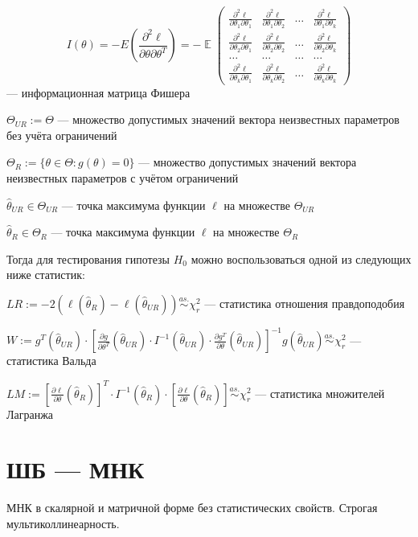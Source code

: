 \documentclass[12pt]{article}
\DeclareMathOperator{\E}{\mathbb{E}}
\begin{document}
\[
I(\theta) = -E \left(\frac{\partial^2 \ell}{\partial \theta \partial \theta^T}\right) = - \E \begin{pmatrix}
\frac{\partial^2 \ell}{\partial \theta_1 \partial \theta_1} & \frac{\partial^2 \ell}{\partial \theta_1 \partial \theta_2} & \ldots & \frac{\partial^2 \ell}{\partial \theta_1 \partial \theta_k} \\
\frac{\partial^2 \ell}{\partial \theta_2 \partial \theta_1} & \frac{\partial^2 \ell}{\partial \theta_2 \partial \theta_2} & \ldots & \frac{\partial^2 \ell}{\partial \theta_2 \partial \theta_k} \\
\ldots & \ldots & \ldots & \ldots \\
\frac{\partial^2 \ell}{\partial \theta_k \partial \theta_1} & \frac{\partial^2 \ell}{\partial \theta_k \partial \theta_2} & \ldots & \frac{\partial^2 \ell}{\partial \theta_k \partial \theta_k} 
\end{pmatrix}
\]
— информационная матрица Фишера

$\Theta_{UR} := \Theta$ — множество допустимых значений вектора неизвестных параметров без учёта ограничений

$\Theta_{R} := \{ \theta \in \Theta: g(\theta) = 0\}$ — множество допустимых значений вектора неизвестных параметров с учётом ограничений

$\hat{\theta}_{UR} \in \Theta_{UR}$ — точка максимума функции $\ell$ на множестве $\Theta_{UR}$

$\hat{\theta}_{R} \in \Theta_{R}$ — точка максимума функции $\ell$ на множестве $\Theta_{R}$

Тогда для тестирования гипотезы $H_0$ можно воспользоваться одной из следующих ниже статистик:

$LR := -2(\ell(\hat{\theta}_{R}) - \ell(\hat{\theta}_{UR})) \overset{as.}{\sim} \chi^2_r$ — статистика отношения правдоподобия

$W := g^T(\hat{\theta}_{UR}) \cdot \left[ \frac{\partial g}{\partial \theta^T}(\hat{\theta}_{UR}) \cdot I^{-1}(\hat{\theta}_{UR}) \cdot \frac{\partial g^T}{\partial \theta}(\hat{\theta}_{UR}) \right]^{-1} g(\hat{\theta}_{UR}) \overset{as.}{\sim} \chi^2_r$ — статистика Вальда

$LM := \left[ \frac{\partial \ell}{\partial \theta}(\hat{\theta}_{R}) \right]^T \cdot I^{-1}(\hat{\theta}_{R}) \cdot \left[ \frac{\partial \ell}{\partial \theta}(\hat{\theta}_{R}) \right] \overset{as.}{\sim} \chi^2_r$ — статистика множителей Лагранжа


\section{ШБ — МНК}
МНК в скалярной и матричной форме без статистических свойств. Строгая мультиколлинеарность. 
\end{document}
